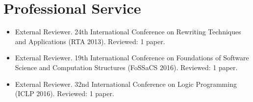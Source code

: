 \documentclass{article}
\begin{document}
\section*{Professional Service}
\begin{itemize}
\item External Reviewer. 24th International Conference on Rewriting
Techniques and Applications (RTA 2013). Reviewed: 1 paper.

\item External Reviewer. 19th International Conference on Foundations 
  of Software Science and Computation Structures (FoSSaCS 2016). Reviewed: 1 paper.

\item External Reviewer. 32nd International Conference on Logic Programming (ICLP 2016). Reviewed: 1 paper.


\end{itemize}


  





  
  
  
%
\end{document}
